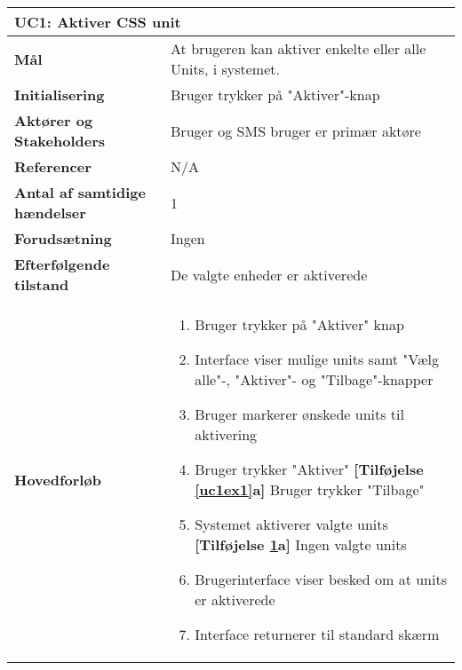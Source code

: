 \begin{table}[H] \centering
	\begin{tabular} {|p{6cm}|p{8cm}|}
	\hline
		\multicolumn{2}{|l|}{\textbf{UC1: Aktiver CSS unit}} \\\hline
		
		\textbf{Mål}							&At brugeren kan aktiver enkelte eller alle Units, i systemet.	\\\hline
		\textbf{Initialisering}				&Bruger trykker på "Aktiver"-knap 								\\\hline
		\textbf{Aktører og Stakeholders}		&Bruger og SMS bruger er primær aktøre 							\\\hline
		\textbf{Referencer}					& N/A															\\\hline
		\textbf{Antal af samtidige hændelser}&1 																\\\hline
		\textbf{Forudsætning}				&Ingen 															\\\hline
		\textbf{Efterfølgende tilstand}		&De valgte enheder er aktiverede 								\\\hline
		\textbf{Hovedforløb}					
			&\begin{enumerate}
	
				\item Bruger trykker på "Aktiver" knap
										
				\item Interface viser mulige units samt "Vælg alle"-, "Aktiver"- og "Tilbage"-knapper
												
				\item \label{uc1select} Bruger markerer ønskede units til aktivering
												
				\item \label{uc1ex1} Bruger trykker "Aktiver"\newline
					\textbf{[Tilføjelse \ref{uc1ex1}a]} Bruger trykker "Tilbage"
												
				\item \label{uc1ex2} Systemet aktiverer valgte units\newline
					\textbf{[Tilføjelse \ref{uc1ex2}a]} Ingen valgte units
				
				\item Brugerinterface viser besked om at units er aktiverede
																	
				\item Interface returnerer til standard skærm 
												
			\end{enumerate}\\\hline
		

\end{tabular}
\end{table}
